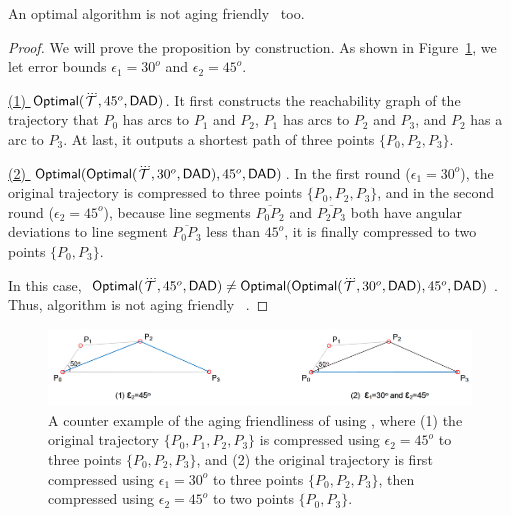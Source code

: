 \begin{proposition}
	\label{theo-aging-dp-dad}
	An optimal algorithm is not aging friendly \wrt~\dad too.
\end{proposition}

\begin{proof}
	We will prove the proposition by construction.
	As shown in Figure~\ref{fig:aging-opt-dad}, we let error bounds $\epsilon_1 =30^o$ and $\epsilon_2=45^o$.
	
	\underline{(1) ${{\mathsf{Optimal}}}(\dddot{\mathcal{T}}, 45^o, {\mathsf{DAD}})$}. 
	It first constructs the reachability graph of the trajectory that $P_0$ has arcs to $P_1$ and $P_2$, $P_1$ has arcs to $P_2$ and $P_3$, and $P_2$ has a arc to $P_3$. At last, it outputs a shortest path of three points $\{P_0, P_2, P_3\}$. 
	
	\underline{(2) ${{\mathsf{Optimal}}}({\mathsf{Optimal}}(\dddot{\mathcal{T}}, 30^o, {\mathsf{DAD}}), 45^o, {\mathsf{DAD}})$}. In the first round ($\epsilon_1=30^o$), the original trajectory is compressed to three points $\{P_0, P_2, P_3\}$, and in the second round ($\epsilon_2=45^o$), because line segments  $\overline{P_0P_2}$ and $\overline{P_2P_3}$ both have angular deviations to line segment $\overline{P_0P_3}$ less than $45^o$, it is finally compressed to two points $\{P_0, P_3\}$.
	
	In this case, ${{\mathsf{Optimal}}}(\dddot{\mathcal{T}}, 45^o, {\mathsf{DAD}}) \ne {{\ensuremath {\mathsf{Optimal}}}}({\mathsf{Optimal}}(\dddot{\mathcal{T}}, 30^o, {\mathsf{DAD}}), 45^o, {\mathsf{DAD}})$. Thus, algorithm \opt is not aging friendly \wrt~\dad.
\end{proof}	
	
\begin{figure}
		\centering
		\includegraphics[scale=0.68]{Figures/Fig-aging-opt.png}
		
		\caption{\small A counter example of the aging friendliness of \opt using \dad, where (1) the original trajectory $\{P_0, P_1, P_2, P_3\}$ is compressed using $\epsilon_2=45^o$ to three points $\{P_0, P_2, P_3\}$, and (2) the original trajectory is first compressed using $\epsilon_1=30^o$ to three points $\{P_0, P_2, P_3\}$, then compressed using $\epsilon_2=45^o$ to two points $\{P_0, P_3\}$. }
		\vspace{-1ex}
		\label{fig:aging-opt-dad}
\end{figure}

